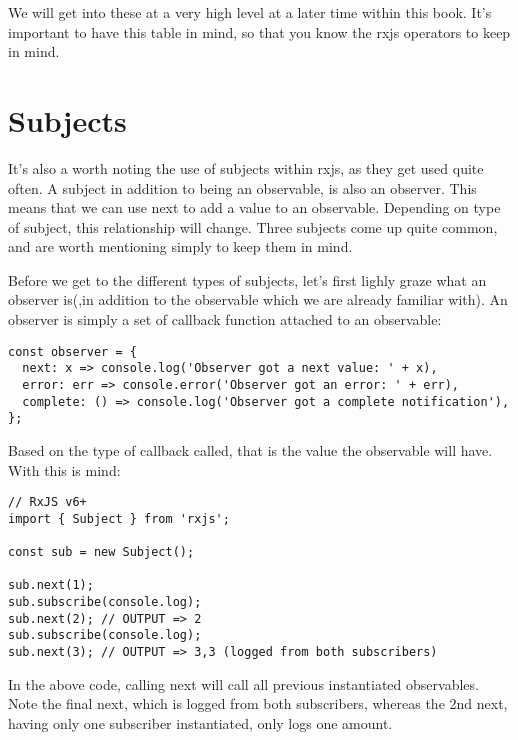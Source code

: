 We will get into these at a very high level at a later time within this book. 
It's important to have this table in mind, so that you know the rxjs operators 
to keep in mind. 

\section{Subjects}
It's also a worth noting the use of subjects within rxjs, as they get used
quite often. A subject in addition to being an observable, is also an observer. 
This means that we can use next to add a value to an observable. Depending on 
type of subject, this relationship will change. Three subjects come up quite 
common, and are worth mentioning simply to keep them in mind. 

Before we get to the different types of subjects, let's first lighly graze 
what an observer is(,in addition to the observable which we are already 
familiar with). An observer is simply a set of callback function attached 
to an observable: 
\begin{verbatim}
const observer = {
  next: x => console.log('Observer got a next value: ' + x),
  error: err => console.error('Observer got an error: ' + err),
  complete: () => console.log('Observer got a complete notification'),
};  
\end{verbatim}

Based on the type of callback called, that is the value the observable will 
have. With this is mind: 

\begin{lstlisting}[caption=using next on our subject]
// RxJS v6+
import { Subject } from 'rxjs';

const sub = new Subject();

sub.next(1);
sub.subscribe(console.log);
sub.next(2); // OUTPUT => 2
sub.subscribe(console.log);
sub.next(3); // OUTPUT => 3,3 (logged from both subscribers)
\end{lstlisting}

In the above code, calling next will call all previous instantiated observables. 
Note the final next, which is logged from both subscribers, whereas the 2nd next, 
having only one subscriber instantiated, only logs one amount.

